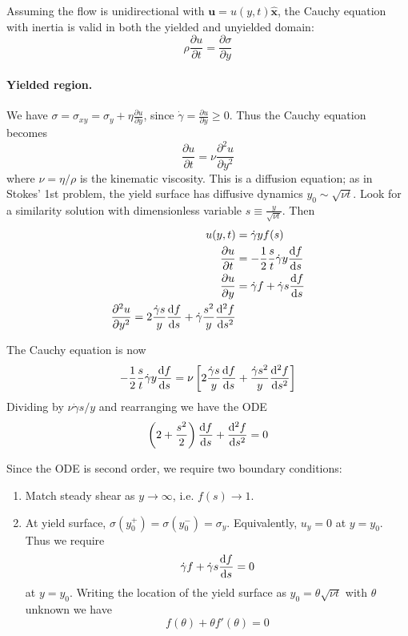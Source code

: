 \documentclass{jknotes}
\newcommand{\srate}{\dot{\gamma}}
\renewcommand{\u}{\bm{u}}
\begin{document}
Assuming the flow is unidirectional with $\u = u(y,t)\hat{\bm{x}}$, the Cauchy
equation with inertia is valid in both the yielded and unyielded domain:
\begin{equation}
	\rho \frac{\partial u}{\partial t} = \frac{\partial \sigma}{\partial y}
\end{equation}

\paragraph{Yielded region.} We have $\sigma = \sigma_{xy} = \sigma_y + \eta
\frac{\partial u}{\partial y}$, since $\srate = \frac{\partial u}{\partial y}
\ge 0$. Thus the Cauchy equation becomes
\begin{equation}
	\frac{\partial u}{\partial t} = \nu \frac{\partial^2 u}{\partial y^2}
\end{equation}
where $\nu = \eta/\rho$ is the kinematic viscosity. This is a diffusion
equation; as in Stokes' 1st problem, the yield surface has diffusive dynamics
$y_0 \sim \sqrt{\nu t}$. Look for a similarity solution with dimensionless
variable $s \equiv \frac{y}{\sqrt{\nu t}}$. Then
\begin{align}
	u(y,t) &= \srate y f(s)\\
	\frac{\partial u}{\partial t} &= -\frac{1}{2}\frac{s}{t} \srate y
	\frac{\diffd f}{\diffd s} \\
	\frac{\partial u}{\partial y} &= \srate f + \srate s \frac{\diffd
	f}{\diffd s} \\
	\frac{\partial^2 u}{\partial y^2} = 2 \frac{\srate s}{y} \frac{\diffd
	f}{\diffd s} + \srate \frac{s^2}{y}\frac{\diffd^2 f}{\diffd s^2}
\end{align}

The Cauchy equation is now
\begin{equation}
	-\frac{1}{2}\frac{s}{t}\srate y \frac{\diffd f}{\diffd s} = \nu \left[ 2
		\frac{\srate s}{y} \frac{\diffd f}{\diffd s} + \frac{\srate s^2}{y}
	\frac{\diffd^2 f}{\diffd s^2} \right] 
\end{equation}
Dividing by $\nu \srate s/ y$ and rearranging we have the ODE
\begin{equation}
	\left( 2+ \frac{s^2}{2}\right) \frac{\diffd f}{\diffd s} + \frac{\diffd^2
	f}{\diffd s^2} = 0
\end{equation}

Since the ODE is second order, we require two boundary conditions:
\begin{enumerate}
	\item Match steady shear as $y \to \infty$, i.e. $f(s) \to 1$.
	\item At yield surface, $\sigma(y_0^+) = \sigma(y_0^-) = \sigma_y$.
		Equivalently, $u_y = 0$ at $y = y_0$. Thus we require
		\begin{equation}
			\srate f + \srate s \frac{\diffd f}{\diffd s } = 0
		\end{equation}
		at $y = y_0$. Writing the location of the yield surface as $y_0 =
		\theta \sqrt{\nu t}$ with $\theta$ unknown we have
		\begin{equation}
			f(\theta) + \theta f'(\theta) = 0
		\end{equation}
\end{enumerate}
\end{document}
